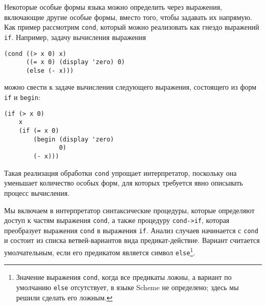 Некоторые особые формы языка 
можно определить через
выражения, включающие другие особые формы, вместо того, чтобы
задавать их напрямую. Как пример рассмотрим
{\tt cond}, который можно реализовать как гнездо выражений
{\tt if}.  Например, задачу вычисления выражения

\begin{Verbatim}[fontsize=\small]
(cond ((> x 0) x)
      ((= x 0) (display 'zero) 0)
      (else (- x)))
\end{Verbatim}
можно свести к задаче вычисления следующего выражения, состоящего из
форм {\tt if} и {\tt begin}:

\begin{Verbatim}[fontsize=\small]
(if (> x 0)
    x
    (if (= x 0)
        (begin (display 'zero)
               0)
        (- x)))
\end{Verbatim}
Такая реализация обработки {\tt cond} упрощает интерпретатор,
поскольку она уменьшает количество особых форм, для которых требуется
явно описывать процесс вычисления.

Мы включаем в интерпретатор синтаксические процедуры,
которые определяют доступ к частям выражения {\tt cond}, а
также процедуру {\tt cond->if}, которая преобразует выражения
{\tt cond} в выражения {\tt if}. Анализ случаев
начинается с {\tt cond} и состоит из списка ветвей-вариантов вида
предикат-действие. Вариант считается умолчательным, если его предикатом
является символ {\tt else}\footnote{Значение выражения {\tt cond}, когда все
предикаты ложны, а вариант по умолчанию {\tt else}
отсутствует, в языке Scheme не определено; здесь мы решили сделать его
ложным.}.

